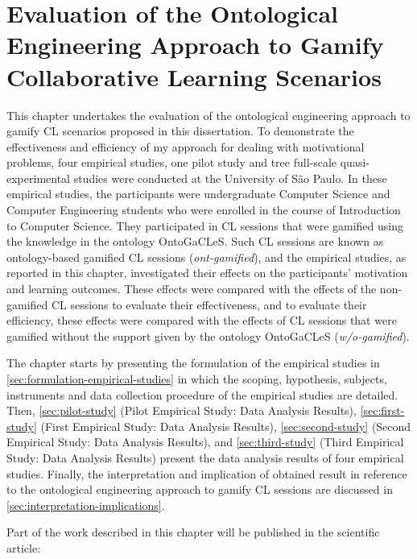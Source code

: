 \chapter[Evaluation of the Ontological Engineering Approach to Gamify CL Scenarios]
{Evaluation of the Ontological Engineering Approach to Gamify Collaborative Learning Scenarios}
\label{chapter:evaluation}

This chapter undertakes the evaluation of the ontological engineering approach to gamify CL scenarios proposed in this dissertation.
To demonstrate the effectiveness and efficiency of my approach for dealing with motivational problems, four empirical studies, one pilot study and tree full-scale quasi-experimental studies were conducted at the University of São Paulo.
In these empirical studies, the participants were undergraduate Computer Science and Computer Engineering students who were enrolled in the course of Introduction to Computer Science.
They participated in CL sessions that were gamified using the knowledge in the ontology OntoGaCLeS.
Such CL sessions are known as ontology-based gamified CL sessions (\emph{ont-gamified}), and the empirical studies, as reported in this chapter, investigated their effects on the participants' motivation and learning outcomes.
These effects were compared with the effects of the non-gamified CL sessions to evaluate their effectiveness, and to evaluate their efficiency, these effects were compared with the effects of CL sessions that were gamified without the support given by the ontology OntoGaCLeS (\emph{w/o-gamified}).

The chapter starts by presenting the formulation of the empirical studies in \autoref{sec:formulation-empirical-studies} in which the scoping, hypothesis, subjects, instruments and data collection procedure of the empirical studies are detailed.
Then, \autoref{sec:pilot-study} (Pilot Empirical Study: Data Analysis Results), \autoref{sec:first-study} (First Empirical Study: Data Analysis Results), \autoref{sec:second-study} (Second Empirical Study: Data Analysis Results), and \autoref{sec:third-study} (Third Empirical Study: Data Analysis Results) present the data analysis results of four empirical studies.
Finally, the interpretation and implication of obtained result in reference to the ontological engineering approach to gamify CL sessions are discussed in \autoref{sec:interpretation-implications}.

Part of the work described in this chapter will be published in the scientific article:

